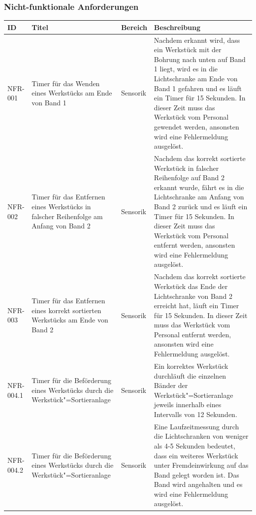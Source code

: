 \documentclass[oneside,a4paper,titlepage]{scrartcl} %
\begin{document}
\newpage

\subsubsection{Nicht-funktionale Anforderungen}
\begin{small}
 \begin{longtable}{|p{2cm}|p{4cm}|p{1.5cm}|p{5.5cm}|}
  \hline
  \textbf{ID} & \textbf{Titel} & \textbf{Bereich} & \textbf{Beschreibung}\\
  \toprule
  \endhead
  \hline
  NFR-001 & Timer für das Wenden eines Werkstücks am Ende von Band 1 & Sensorik & Nachdem erkannt wird, dass ein Werkstück mit der Bohrung nach unten auf Band 1 liegt, wird es in die Lichtschranke am Ende von Band 1 gefahren und es läuft ein Timer für 15 Sekunden. In dieser Zeit muss das Werkstück vom Personal gewendet werden, ansonsten wird eine Fehlermeldung ausgelöst.\\
  \hline
  \rowcolor{lightgray} NFR-002 & Timer für das Entfernen eines Werkstücks in falscher Reihenfolge am Anfang von Band 2 & Sensorik & Nachdem das korrekt sortierte Werkstück in falscher Reihenfolge auf Band 2 erkannt wurde, fährt es in die Lichtschranke am Anfang von Band 2 zurück und es läuft ein Timer für 15 Sekunden. In dieser Zeit muss das Werkstück vom Personal entfernt werden, ansonsten wird eine Fehlermeldung ausgelöst.\\
  \hline
  NFR-003 & Timer für das Entfernen eines korrekt sortierten Werkstücks am Ende von Band 2 & Sensorik & Nachdem das korrekt sortierte Werkstück das Ende der Lichtschranke von Band 2 erreicht hat, läuft ein Timer für 15 Sekunden. In dieser Zeit muss das Werkstück vom Personal entfernt werden, ansonsten wird eine Fehlermeldung ausgelöst.\\
  \hline
  \rowcolor{lightgray} NFR-004.1 & Timer für die Beförderung eines Werkstücks durch die Werkstück"=Sortieranlage & Sensorik & Ein korrektes Werkstück durchläuft die einzelnen Bänder der Werkstück"=Sortieranlage jeweils innerhalb eines Intervalls von 12 Sekunden.\\
  \hline
  \rowcolor{lightgray} NFR-004.2 & Timer für die Beförderung eines Werkstücks durch die Werkstück"=Sortieranlage & Sensorik & Eine Laufzeitmessung durch die Lichtschranken von weniger als 4-5 Sekunden bedeutet, dass ein weiteres Werkstück unter Fremdeinwirkung auf das Band gelegt worden ist. Das Band wird angehalten und es wird eine Fehlermeldung ausgelöst.\\

\end{longtable}
\end{small}
\end{document}
